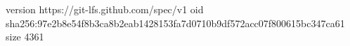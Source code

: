 version https://git-lfs.github.com/spec/v1
oid sha256:97e2b8e54f8b3ca8b2eab1428153fa7d0710b9df572acc07f800615bc347ca61
size 4361
